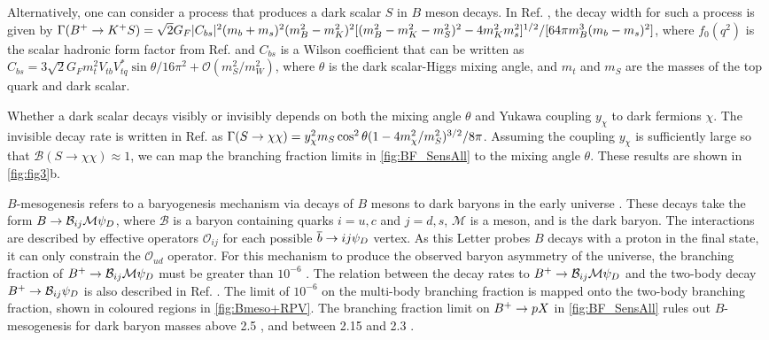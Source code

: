 Alternatively, one can consider a process that produces a dark scalar $S$ in $B$ meson decays. In Ref. \cite{PhysRevD.101.095006}, the decay width for such a process is given by $\Gamma(\Bp\to\Kp\S) = \sqrt{2}G_F|C_{bs}|^2(m_b + m_s)^2(m^2_B - m^2_K)^2[(m^2_B - m^2_K - m^2_S)^2 - 4m^2_Km^2_s]^{1/2}/[64\pi m^3_B(m_b - m_s)^2]$, where $f_0(q^2)$ is the scalar hadronic form factor from Ref. \cite{PhysRevD.93.025026} and $C_{bs}$ is a Wilson coefficient that can be written as $C_{bs} = 3\sqrt{2}G_Fm_t^2V_{tb}V^*_{tq}\sin\theta/16\pi^2 + \mathcal{O}(m_S^2/m^2_W)$, where $\theta$ is the dark scalar-Higgs mixing angle, and $m_t$ and $m_S$ are the masses of the top quark and dark scalar.

Whether a dark scalar decays visibly or invisibly depends on both the mixing angle $\theta$ and Yukawa coupling $y_\chi$ to dark fermions $\chi$. The invisible decay rate is written in Ref. \cite{PhysRevD.101.095006} as $\Gamma(\S\to\chi\chi) = y_\chi^2m_S\cos^2\theta(1 - 4m_\chi^2/m_S^2)^{3/2}/8\pi$. Assuming the coupling $y_\chi$ is sufficiently large so that $\mathcal{B}(S\to\chi\chi) \approx 1$, we can map the branching fraction limits in \cref{fig:BF_SensAll} to the mixing angle $\theta$. These results are shown in \cref{fig:fig3}b.


$B$-mesogenesis refers to a baryogenesis mechanism via decays of $B$ mesons to dark baryons in the early universe \cite{Elor_2019}. These decays take the form $B\to\mathcal{B}_{ij}\mathcal{M}\psiD$, where $\mathcal{B}$ is a baryon containing quarks $i=u,c$ and $j=d,s$, $\mathcal{M}$ is a meson, and \psiD is the dark baryon. The interactions are described by effective operators $\mathcal{O}_{ij}$ for each possible $\bbar\to ij\psiD$ vertex. As this Letter probes $B$ decays with a proton in the final state, it can only constrain the $\mathcal{O}_{ud}$ operator. For this mechanism to produce the observed baryon asymmetry of the universe, the branching fraction of $\Bp\to\mathcal{B}_{ij}\mathcal{M}\psiD$ must be greater than $10^{-6}$ \cite{Alonso_lvarez_2021}. The relation between the decay rates to $\Bp\to\mathcal{B}_{ij}\mathcal{M}\psiD$ and the two-body decay $\Bp\to\mathcal{B}_{ij}\psiD$ is also described in Ref. \cite{Alonso_lvarez_2021}. The limit of $10^{-6}$ on the multi-body branching fraction is mapped onto the two-body branching fraction, shown in coloured regions in \cref{fig:Bmeso+RPV}. The branching fraction limit on $\Bp\to\pp\X$ in \cref{fig:BF_SensAll} rules out $B$-mesogenesis for dark baryon masses above 2.5 \gevcc, and between 2.15 and 2.3 \gevcc.

